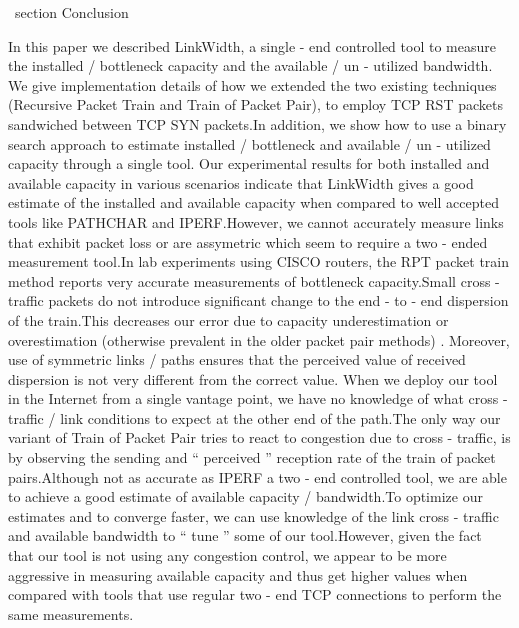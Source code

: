 
\ section
{
Conclusion}

In this paper we described LinkWidth, a single - end controlled tool to
  measure the installed / bottleneck capacity and the available / un -
  utilized bandwidth.
  We give implementation details of how we extended the two existing
techniques (Recursive Packet Train and Train of Packet Pair),
to employ TCP RST packets sandwiched between TCP SYN packets.In addition,
we show how to use a binary search approach to estimate installed / bottleneck and available / un -
utilized capacity through a single tool.
Our experimental results for both installed and available capacity in various scenarios indicate that LinkWidth gives a good estimate of the
installed and available capacity when compared to well accepted tools like PATHCHAR and IPERF.However,
we cannot accurately measure links that exhibit packet loss or are assymetric which seem to require a two -
ended measurement tool.In lab experiments using CISCO routers,
the RPT packet train method reports very accurate measurements of bottleneck capacity.Small cross - traffic packets
do
    not introduce
    significant change to the end - to - end dispersion of the train.This
    decreases our error due to capacity underestimation or overestimation
    (otherwise prevalent in the older packet pair methods)
    . Moreover, use
      of symmetric links / paths ensures that the perceived value of received
      dispersion is not very different from the correct value.
      When we deploy our tool in the Internet from a single vantage point,
      we have no knowledge of what cross - traffic / link conditions to expect
      at the other end of the path.The only way our variant of Train of
      Packet Pair tries to react to congestion due to cross - traffic, is by
      observing the sending and `` perceived '' reception rate of the train of
      packet pairs.Although not as accurate as IPERF a two - end controlled
      tool, we are able to achieve a good estimate of available
      capacity / bandwidth.To optimize our estimates and to converge faster,
      we can use knowledge of the link cross - traffic and available bandwidth
      to `` tune '' some of our tool.However, given the fact that our tool is
      not using any congestion control, we appear to be more aggressive in
      measuring available capacity and thus get higher values when compared
      with tools that use regular two - end TCP connections to perform the
      same measurements.

